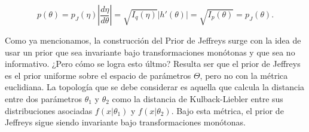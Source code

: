 \begin{equation}
	p(\theta) = p_J(\eta) \left|\frac{d \eta}{d \theta}\right| = \sqrt{I_q(\eta)}\left|h'(\theta)\right| = \sqrt{I_p(\theta)} = p_J(\theta).
\end{equation}

Como ya mencionamos, la construcción del Prior de Jeffreys surge con la idea de usar un prior que sea invariante bajo transformaciones monótonas y que sea no informativo. ¿Pero cómo se logra esto últmo? Resulta ser que el prior de Jeffreys es el prior uniforme sobre el espacio de parámetros $\Theta$, pero no con la métrica euclidiana. La topología que se debe considerar es aquella que calcula la distancia entre dos 
parámetros $\theta_1$ y $\theta_2$ como la distancia de Kulback-Liebler entre sus distribuciones asociadas $f(x|\theta_1)$ y $f(x|\theta_2)$.
Bajo esta métrica, el prior de Jeffreys sigue siendo invariante bajo transformaciones monótonas.